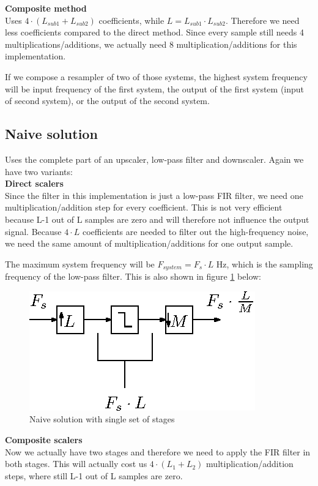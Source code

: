 \documentclass[a4paper,twoside,11pt, fleqn]{article}
\begin{document}
\textbf{Composite method}\\
Uses $4\cdot (L_{sub1} + L_{sub2})$ coefficients, while $L = L_{sub1} \cdot L_{sub2}$. Therefore we need less coefficients compared to the direct method. Since every sample still needs 4 multiplications/additions, we actually need 8 multiplication/additions for this implementation.

\smallskip
If we compose a resampler of two of those systems, the highest system frequency will be input frequency of the first system, the output of the first system (input of second system), or the output of the second system.

\subsection{Naive solution}
Uses the complete part of an upscaler, low-pass filter and downscaler. Again we have two variants:\\

\textbf{Direct scalers}\\
Since the filter in this implementation is just a low-pass FIR filter, we need one multiplication/addition step for every coefficient. This is not very efficient because L-1 out of L samples are zero and will therefore not influence the output signal. Because $4\cdot L$ coefficients are needed to filter out the high-frequency noise, we need the same amount of multiplication/additions for one output sample.

\smallskip
The maximum system frequency will be $F_{system} = F_s\cdot L$ Hz, which is the sampling frequency of the low-pass filter. This is also shown in figure \ref{fig:naive} below:
\begin{figure}[h]
	\includegraphics[scale = 1]{Images/3_0}
    \caption{Naive solution with single set of stages}
    \label{fig:naive}
\end{figure}

\textbf{Composite scalers } \\
Now we actually have two stages and therefore we need to apply the FIR filter in both stages. This will actually cost us $4\cdot (L_1 + L_2)$ multiplication/addition steps, where still L-1 out of L samples are zero.
\end{document}
